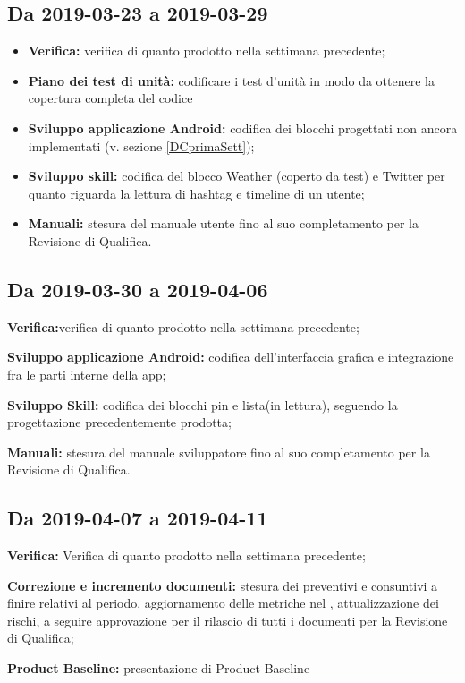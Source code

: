 \begin{flushleft}
\subsection{Da 2019-03-23 a 2019-03-29}
\begin{itemize}
	\item \textbf{Verifica:} verifica di quanto prodotto nella settimana precedente;
	\item \textbf{Piano dei test di unità:} codificare i test d'unità in modo da ottenere la copertura completa del codice
	\item \textbf{Sviluppo applicazione Android:} codifica dei blocchi progettati non ancora implementati (v. sezione \ref{DCprimaSett});
	\item \textbf{Sviluppo skill:} codifica del blocco Weather (coperto da test) e Twitter per quanto riguarda la lettura di hashtag e timeline di un utente;
	\item \textbf{Manuali:} stesura del manuale utente fino al suo completamento per la Revisione di Qualifica.  
\end{itemize}

\subsection{Da 2019-03-30 a 2019-04-06}
 	\item \textbf{Verifica:}verifica di quanto prodotto nella settimana precedente;
	\item \textbf{Sviluppo applicazione Android:} codifica dell'interfaccia grafica e integrazione fra le parti interne della app;
	\item \textbf{Sviluppo Skill:} codifica dei blocchi pin e lista(in lettura), seguendo la progettazione precedentemente prodotta;
	\item \textbf{Manuali:} stesura del manuale sviluppatore fino al suo completamento per la Revisione di Qualifica.
\subsection{Da 2019-04-07 a 2019-04-11}
	\item \textbf{Verifica:} Verifica di quanto prodotto nella settimana precedente;
	\item \textbf{Correzione e incremento documenti:} stesura dei preventivi e consuntivi a finire relativi al periodo, aggiornamento delle metriche nel \pianodiqualifica, attualizzazione dei rischi, a seguire approvazione per il rilascio di tutti i documenti per la Revisione di Qualifica;
	\item \textbf{Product Baseline:} presentazione di Product Baseline


\end{flushleft}
